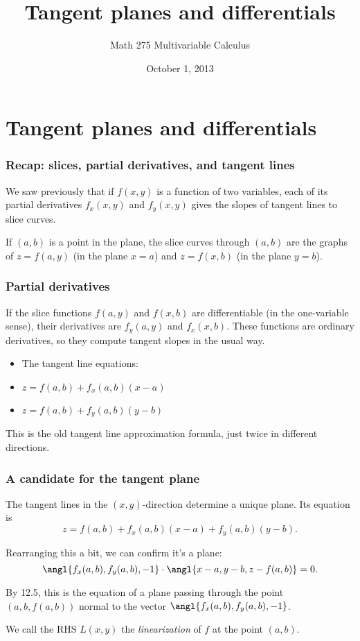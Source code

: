 \documentclass[11pt,ignorenonframetext,aspectratio=169,xcolor={svgnames}]{beamer}
\title{Tangent planes and differentials}
\author{Math 275 Multivariable Calculus}
\date{October 1, 2013}
\begin{document}
\frame{\titlepage}

\section{Tangent planes and differentials}

\begin{frame}\frametitle{Recap: slices, partial derivatives, and tangent
lines}

We saw previously that if $f(x,y)$ is a function of two variables, each
of its partial derivatives $f_x(x,y)$ and $f_y(x,y)$ gives the slopes of
tangent lines to slice curves.

If $(a, b)$ is a point in the plane, the slice curves through $(a,b)$
are the graphs of $z = f(a, y)$ (in the plane $x = a$) and $z = f(x, b)$
(in the plane $y = b$).

\end{frame}

\begin{frame}\frametitle{Partial derivatives}

If the slice functions $f(a, y)$ and $f(x,b)$ are differentiable (in the
one-variable sense), their derivatives are $f_y(a,y)$ and $f_x(x,b)$.
These functions are ordinary derivatives, so they compute tangent slopes
in the usual way.

\begin{itemize}[<+->]

\item
  The tangent line equations:
\item
  $z = f(a, b) + f_x(a,b)(x - a)$
\item
  $z = f(a, b) + f_y(a,b)(y - b)$
\end{itemize}

This is the old tangent line approximation formula, just twice in
different directions.

\end{frame}

\begin{frame}\frametitle{A candidate for the tangent plane}

The tangent lines in the $(x,y)$-direction determine a unique plane. Its
equation is \[ z = f(a,b) + f_x(a,b)(x-a) + f_y(a,b)(y - b). \]

Rearranging this a bit, we can confirm it's a plane:
\[ \angl{f_x(a,b), f_y(a,b), -1} \cdot \angl{x - a, y - b, z - f(a,b)} = 0. \]

By 12.5, this is the equation of a plane passing through the point
$(a, b, f(a, b))$ normal to the vector $\angl{f_x(a,b), f_y(a,b), -1}$.

We call the RHS $L(x,y)$ the \emph{linearization} of $f$ at the point
$(a,b)$.

\end{frame}
\end{document}
